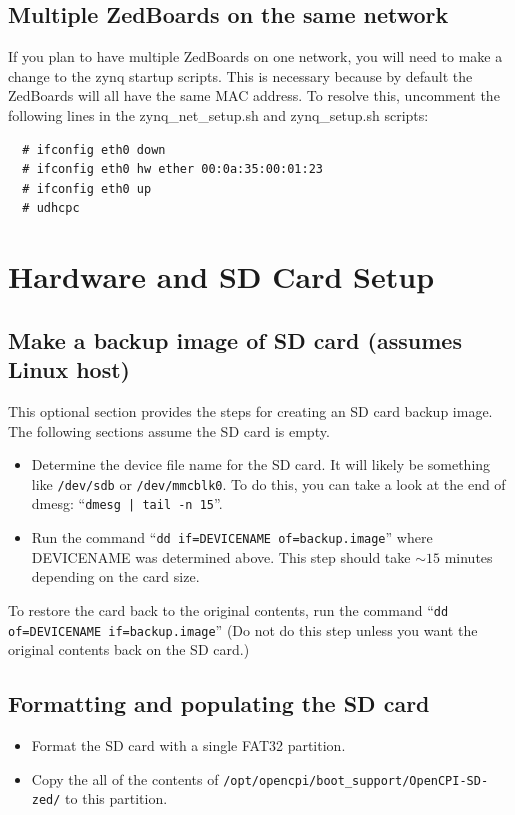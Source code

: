 \subsection{Multiple ZedBoards on the same network}
If you plan to have multiple ZedBoards on one network, you will need to make a change to the zynq startup scripts. This is necessary because by default the ZedBoards will all have the same MAC address. To resolve this, uncomment the following lines in the zynq\_net\_setup.sh and zynq\_setup.sh scripts:
\begin{verbatim}
  # ifconfig eth0 down
  # ifconfig eth0 hw ether 00:0a:35:00:01:23
  # ifconfig eth0 up
  # udhcpc
\end{verbatim}
\section{Hardware and SD Card Setup}
\label{sec:HW_Setup}
\subsection*{Make a backup image of SD card (assumes Linux host)}
This optional section provides the steps for creating an SD card backup image. The following sections assume the SD card is empty.
\begin{itemize}
\item Determine the device file name for the SD card. It will likely be something like \texttt{/dev/sdb} or \texttt{/dev/mmcblk0}. To do this, you can take a look at the end of dmesg: ``\texttt{dmesg | tail -n 15}''.
\item Run the command ``\texttt{dd if=DEVICENAME of=backup.image}'' where DEVICENAME was determined above. This step should take $\sim15$ minutes depending on the card size.
\end{itemize}
\noindent To restore the card back to the original contents, run the command ``\texttt{dd of=DEVICENAME if=backup.image}'' (Do not do this step unless you want the original contents back on the SD card.)
\subsection*{Formatting and populating the SD card}
\begin{itemize}
\item Format the SD card with a single FAT32 partition.
\item Copy the all of the contents of \texttt{/opt/opencpi/boot\_support/OpenCPI-SD-zed/} to this partition.
\end{itemize}
